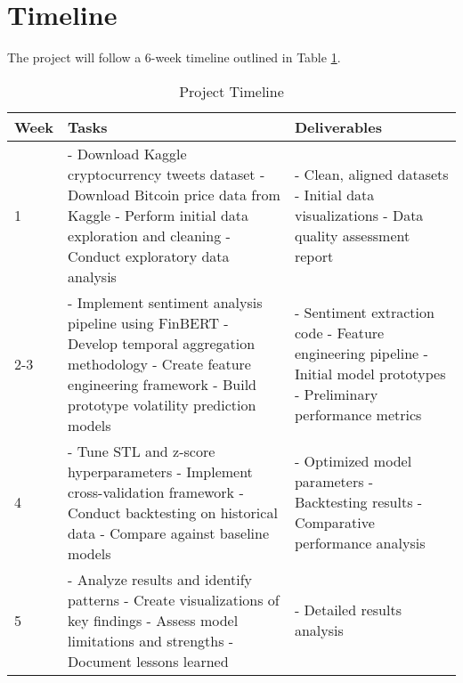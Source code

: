 \documentclass[11pt,twocolumn]{article}
\begin{document}
\section{Timeline}
The project will follow a 6-week timeline outlined in Table \ref{tab:timeline}.

\begin{table}[h]
\caption{Project Timeline}
\label{tab:timeline}
\centering
\begin{tabular}{|p{0.5cm}|p{3.5cm}|p{3.5cm}|}
\hline
Week & Tasks & Deliverables \\
\hline
1 & - Download Kaggle cryptocurrency tweets dataset\newline
- Download Bitcoin price data from Kaggle\newline
- Perform initial data exploration and cleaning\newline
- Conduct exploratory data analysis & - Clean, aligned datasets\newline
- Initial data visualizations\newline
- Data quality assessment report \\
\hline
2-3 & - Implement sentiment analysis pipeline using FinBERT\newline
- Develop temporal aggregation methodology\newline
- Create feature engineering framework\newline
- Build prototype volatility prediction models & - Sentiment extraction code\newline
- Feature engineering pipeline\newline
- Initial model prototypes\newline
- Preliminary performance metrics \\
\hline
4 & - Tune STL and z-score hyperparameters\newline
- Implement cross-validation framework\newline
- Conduct backtesting on historical data\newline
- Compare against baseline models & - Optimized model parameters\newline
- Backtesting results\newline
- Comparative performance analysis \\
\hline
5 & - Analyze results and identify patterns\newline
- Create visualizations of key findings\newline
- Assess model limitations and strengths\newline
- Document lessons learned & - Detailed results analysis\newline

\end{tabular}
\end{table}
\end{document}
